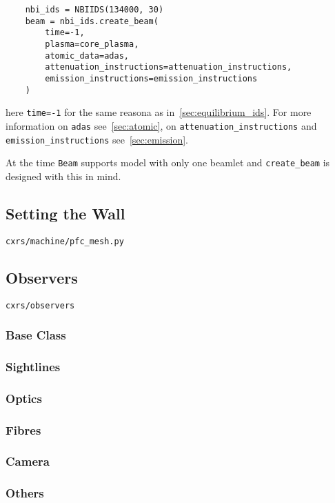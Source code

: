 \documentclass[../main.tex]{subfiles}
\begin{document}
\begin{verbatim}
    nbi_ids = NBIIDS(134000, 30)
    beam = nbi_ids.create_beam(
        time=-1,
        plasma=core_plasma,
        atomic_data=adas,
        attenuation_instructions=attenuation_instructions,
        emission_instructions=emission_instructions
    )
\end{verbatim}

here \texttt{time=-1} for the same reasona as in~\cref{sec:equilibrium_ids}. For more information on \texttt{adas} see~\cref{sec:atomic}, on \texttt{attenuation\_instructions} and \texttt{emission\_instructions} see~\cref{sec:emission}.

At the time \texttt{Beam} supports model with only one beamlet and \texttt{create\_beam} is designed with this in mind.

\subsection{Setting the Wall}%
\label{sec:wall}

\texttt{cxrs/machine/pfc\_mesh.py}

\subsection{Observers}%
\label{sec:observers}

\texttt{cxrs/observers}

\subsubsection{Base Class}%
\label{sec:observers_base}

\subsubsection{Sightlines}%
\label{sec:sightlines}

\subsubsection{Optics}
\subsubsection{Fibres}
\subsubsection{Camera}
\subsubsection{Others}
\end{document}
